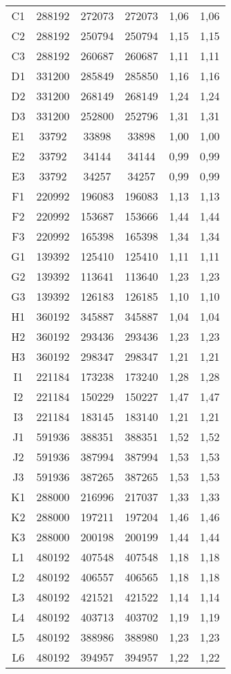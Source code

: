 \begin{center}
\begin{longtable}{cccccc}
C1    & 288192 & 272073 & 272073 & 1,06  & 1,06 \\
C2    & 288192 & 250794 & 250794 & 1,15  & 1,15 \\
C3    & 288192 & 260687 & 260687 & 1,11  & 1,11 \\
D1    & 331200 & 285849 & 285850 & 1,16  & 1,16 \\
D2    & 331200 & 268149 & 268149 & 1,24  & 1,24 \\
D3    & 331200 & 252800 & 252796 & 1,31  & 1,31 \\
E1    & 33792 & 33898 & 33898 & 1,00  & 1,00 \\
E2    & 33792 & 34144 & 34144 & 0,99  & 0,99 \\
E3    & 33792 & 34257 & 34257 & 0,99  & 0,99 \\
F1    & 220992 & 196083 & 196083 & 1,13  & 1,13 \\
F2    & 220992 & 153687 & 153666 & 1,44  & 1,44 \\
F3    & 220992 & 165398 & 165398 & 1,34  & 1,34 \\
G1    & 139392 & 125410 & 125410 & 1,11  & 1,11 \\
G2    & 139392 & 113641 & 113640 & 1,23  & 1,23 \\
G3    & 139392 & 126183 & 126185 & 1,10  & 1,10 \\
H1    & 360192 & 345887 & 345887 & 1,04  & 1,04 \\
H2    & 360192 & 293436 & 293436 & 1,23  & 1,23 \\
H3    & 360192 & 298347 & 298347 & 1,21  & 1,21 \\
I1    & 221184 & 173238 & 173240 & 1,28  & 1,28 \\
I2    & 221184 & 150229 & 150227 & 1,47  & 1,47 \\
I3    & 221184 & 183145 & 183140 & 1,21  & 1,21 \\
J1    & 591936 & 388351 & 388351 & 1,52  & 1,52 \\
J2    & 591936 & 387994 & 387994 & 1,53  & 1,53 \\
J3    & 591936 & 387265 & 387265 & 1,53  & 1,53 \\
K1    & 288000 & 216996 & 217037 & 1,33  & 1,33 \\
K2    & 288000 & 197211 & 197204 & 1,46  & 1,46 \\
K3    & 288000 & 200198 & 200199 & 1,44  & 1,44 \\
L1    & 480192 & 407548 & 407548 & 1,18  & 1,18 \\
L2    & 480192 & 406557 & 406565 & 1,18  & 1,18 \\
L3    & 480192 & 421521 & 421522 & 1,14  & 1,14 \\
L4    & 480192 & 403713 & 403702 & 1,19  & 1,19 \\
L5    & 480192 & 388986 & 388980 & 1,23  & 1,23 \\
L6    & 480192 & 394957 & 394957 & 1,22  & 1,22 \\
\end{longtable}
\end{center}

